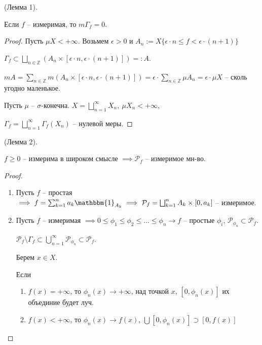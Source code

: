 \begin{lemma}
    (Лемма 1).
    
    Если $f$ -- измеримая, то $m \Gamma_f = 0$.
\end{lemma}
\begin{proof}
    Пусть $\mu X < +\infty$. Возьмем $\epsilon > 0$ и $A_n := X \{ \epsilon \cdot n \leq f < \epsilon \cdot (n + 1) \}$

    $\Gamma_f \subset \bigsqcup_{n \in \mathbb{Z}} \left(A_n \times [\epsilon \cdot n, \epsilon \cdot (n + 1)]\right) =: A$.


    $m A = \sum_{n \in \mathbb{Z}} m \left( A_n \times [\epsilon \cdot n, \epsilon \cdot (n + 1)] \right) = \epsilon \cdot \sum_{n \in \mathbb{Z}} \mu A_n = \epsilon \cdot \mu X$ -- сколь угодно маленькое.

    Пусть $\mu$ -- $\sigma$-конечна. $X = \bigsqcup_{n=1}^{\infty} X_n, \ \mu X_n < +\infty$,
    
    $\Gamma_f = \bigsqcup_{n=1}^{\infty} \Gamma_f (X_n)$ -- нулевой меры.
\end{proof}

\begin{lemma}
    (Лемма 2).

    $f \geq 0$ -- измерима в широком смысле $\implies \mathcal{P}_f$ -- измеримое мн-во.
\end{lemma}
\begin{proof}
    \begin{enumerate}
        \item {
            Пусть $f$ -- простая $\implies f = \sum_{k = 1}^{n} a_k \mathbbm{1}_{A_k} \implies \mathcal{P}_f = \bigsqcup_{k=1}^{n} A_k \times [0, a_k]$ -- измеримое.
        }

        \item {
            Пусть $f$ -- измеримая $\implies 0 \leq \phi_1 \leq \phi_2 \leq \dots \leq \phi_n \rightarrow f$ -- простые $\phi_i$, $\mathcal{P}_{\phi_n} \subset \mathcal{P}_f$.

            $\mathcal{P}_f \setminus \Gamma_f \subset \bigcup_{n=1}^{\infty} \mathcal{P}_{\phi_n} \subset \mathcal{P}_f$.

            Берем $x \in X$.
            
            Если
            \begin{enumerate}
                \item {
                    $f(x) = +\infty$, то $\phi_n(x) \rightarrow +\infty$, над точкой $x$, $[0, \phi_n(x)]$ их объединие будет луч.
                }
                \item {
                    $f(x) < +\infty$, то $\phi_n(x) \rightarrow f(x)$, $\bigcup [0, \phi_n(x)] \supset [0, f(x)]$
                }
            \end{enumerate}
        }
    \end{enumerate}
\end{proof}

